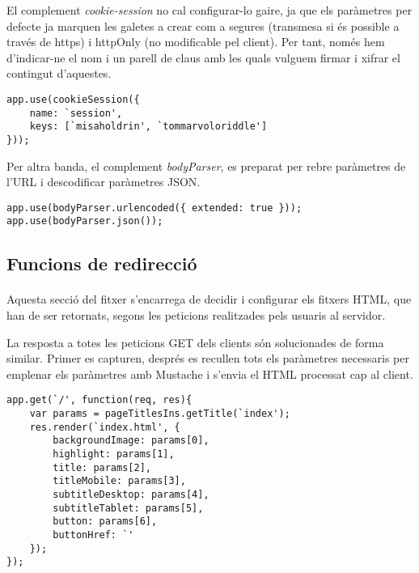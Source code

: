     El complement \emph{cookie-session} no cal configurar-lo gaire, ja que els paràmetres per defecte ja marquen les galetes a crear com a segures (transmesa si és possible a través de https) i httpOnly (no modificable pel client). Per tant, només hem d'indicar-ne el nom i un parell de claus amb les quals vulguem firmar i xifrar el contingut d'aquestes.

    \begin{lstlisting}[style=rawOwn,caption={Configuració del complement \emph{cookie-session}}]
app.use(cookieSession({
    name: `session',
    keys: [`misaholdrin', `tommarvoloriddle']
}));
    \end{lstlisting}

    Per altra banda, el complement \emph{bodyParser}, es preparat per rebre paràmetres de l'URL i descodificar paràmetres JSON.

    \begin{lstlisting}[style=rawOwn,caption={Configuració del complement \emph{bodyParser}}]
app.use(bodyParser.urlencoded({ extended: true }));
app.use(bodyParser.json());
    \end{lstlisting}


    \subsection{Funcions de redirecció}

    \paragraph{}
    Aquesta secció del fitxer s'encarrega de decidir i configurar els fitxers HTML, que han de ser retornats, segons les peticions realitzades pels usuaris al servidor.

    La resposta a totes les peticions GET dels clients són solucionades de forma similar. Primer es capturen, després es recullen tots els paràmetres necessaris per emplenar els paràmetres amb Mustache i s'envia el HTML processat cap al client.

    \begin{lstlisting}[style=rawOwn,caption={Respota del servidor davant la petició del recurs `/'}]
app.get(`/', function(req, res){
    var params = pageTitlesIns.getTitle(`index');
    res.render(`index.html', {
        backgroundImage: params[0],
        highlight: params[1],
        title: params[2],
        titleMobile: params[3],
        subtitleDesktop: params[4],
        subtitleTablet: params[5],
        button: params[6],
        buttonHref: `'
    });
});
    \end{lstlisting}

